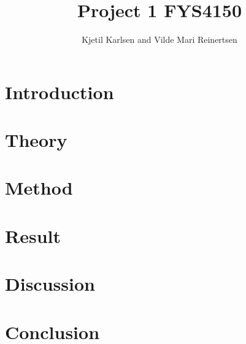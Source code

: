 

\title{Project 1 FYS4150}
\author{Kjetil Karlsen and Vilde Mari Reinertsen}
\raggedbottom



\maketitle

\begin{abstract}







  
\tableofcontents
\end{abstract}

\twocolumn

\section{Introduction}


\section{Theory}


\section{Method}


\section{Result}


\section{Discussion}


\section{Conclusion}









